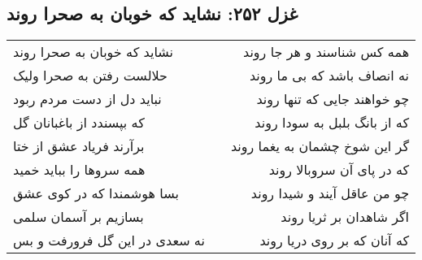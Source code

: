 \begin{center}
\section*{غزل ۲۵۲: نشاید که خوبان به صحرا روند}
\label{sec:252}
\begin{longtable}{l p{0.5cm} r}
نشاید که خوبان به صحرا روند
&&
همه کس شناسند و هر جا روند
\\
حلالست رفتن به صحرا ولیک
&&
نه انصاف باشد که بی ما روند
\\
نباید دل از دست مردم ربود
&&
چو خواهند جایی که تنها روند
\\
که بپسندد از باغبانان گل
&&
که از بانگ بلبل به سودا روند
\\
برآرند فریاد عشق از ختا
&&
گر این شوخ چشمان به یغما روند
\\
همه سروها را بباید خمید
&&
که در پای آن سروبالا روند
\\
بسا هوشمندا که در کوی عشق
&&
چو من عاقل آیند و شیدا روند
\\
بسازیم بر آسمان سلمی
&&
اگر شاهدان بر ثریا روند
\\
نه سعدی در این گل فرورفت و بس
&&
که آنان که بر روی دریا روند
\\
\end{longtable}
\end{center}
